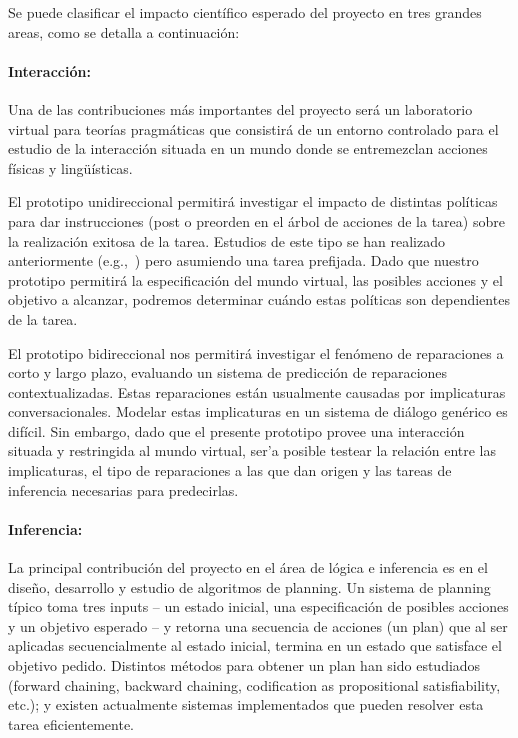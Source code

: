 
Se puede clasificar el impacto cient\'ifico
esperado del proyecto en tres grandes areas, como se detalla a continuaci\'on:

\paragraph{Interacci\'on:}
Una de las contribuciones m\'as
importantes del proyecto ser\'a un laboratorio virtual para
teor\'ias pragm\'aticas que consistir\'a de un
entorno controlado para el estudio de la interacci\'on situada en un mundo donde
se entremezclan acciones f\'isicas y ling\"u\'isticas.

El prototipo unidireccional permitir\'a
investigar el impacto de distintas
pol\'iticas para dar instrucciones (post o
preorden en el \'arbol de acciones de la tarea)
sobre la realizaci\'on exitosa de la tarea.
Estudios de este tipo se han realizado anteriormente
(e.g.,~\citep{foster-etal-ijcai2009}) pero
asumiendo una tarea prefijada.
Dado que nuestro prototipo permitir\'a la especificaci\'on
del mundo virtual, las posibles acciones y el objetivo
a alcanzar, podremos determinar cu\'ando estas pol\'iticas
son dependientes de la tarea.

El prototipo bidireccional nos permitir\'a investigar el
fen\'omeno de reparaciones a corto y largo plazo,
evaluando un sistema de predicci\'on de reparaciones
contextualizadas.  Estas reparaciones est\'an usualmente
causadas por implicaturas conversacionales.  Modelar
estas implicaturas en un sistema de di\'alogo gen\'erico
es dif\'icil.  Sin embargo, dado que el presente prototipo provee una
interacci\'on situada
y restringida al mundo virtual, ser'a posible testear la relaci\'on entre
las implicaturas, el tipo de reparaciones a las que
dan origen y las tareas de inferencia necesarias para
predecirlas.

\paragraph{Inferencia:} La principal contribuci\'on del
proyecto en el \'area de l\'ogica e inferencia es en el
dise\~no, desarrollo y estudio de algoritmos de planning.
Un sistema de planning t\'ipico toma tres inputs -- un
estado inicial, una especificaci\'on de posibles acciones y
un objetivo esperado -- y retorna una secuencia de acciones (un plan)
que al ser aplicadas secuencialmente al estado inicial, termina
en un estado que satisface el objetivo pedido.  Distintos
m\'etodos para obtener un plan han sido estudiados (forward chaining, backward
chaining, codification as propositional
satisfiability, etc.); y existen actualmente sistemas
implementados que pueden resolver esta tarea eficientemente.

